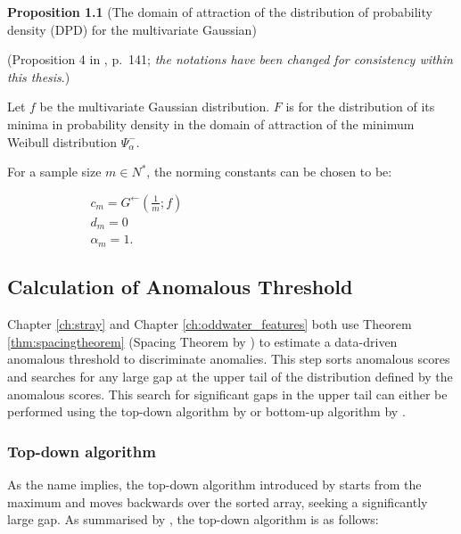 \documentclass{monashthesis}
\theoremstyle{definition}
\theoremstyle{definition}
\theoremstyle{definition}
\theoremstyle{remark}
\begin{document}
\textbf{Proposition 1.1} (The domain of attraction of the distribution of probability density (DPD) for the multivariate Gaussian)

(Proposition 4 in \textcite{hugueny2013novelty}, p.~141; \emph{the notations have been changed for consistency within this thesis}.)

Let \(f\) be the multivariate Gaussian distribution. \(F\) is for the distribution of its minima in probability density in the domain of attraction of the minimum Weibull distribution \(\Psi_{\alpha}^{-}\).

For a sample size \(m\in N^{*}\), the norming constants can be chosen to be:

\begin{flushleft}
        $\;\;\;\;\;\;\;\;\;\;\;\;\;\;\;\;\;\;\;\;\;\;\;\;c_{m} = G^{\longleftarrow} (\frac{1}{m};f)$\\
        $\;\;\;\;\;\;\;\;\;\;\;\;\;\;\;\;\;\;\;\;\;\;\;\;d_{m} = 0$\\
    $\;\;\;\;\;\;\;\;\;\;\;\;\;\;\;\;\;\;\;\;\;\;\;\;\alpha_{m}=1$.
\end{flushleft}

\hypertarget{calculation-of-anomalous-threshold}{%
\subsection{Calculation of Anomalous Threshold}\label{calculation-of-anomalous-threshold}}

Chapter \ref{ch:stray} and Chapter \ref{ch:oddwater_features} both use Theorem \ref{thm:spacingtheorem} (Spacing Theorem by \textcite{weissman1978estimation}) to estimate a data-driven anomalous threshold to discriminate anomalies. This step sorts anomalous scores and searches for any large gap at the upper tail of the distribution defined by the anomalous scores. This search for significant gaps in the upper tail can either be performed using the top-down algorithm by \textcite{burridge2006additive} or bottom-up algorithm by \textcite{schwarz2008wind}.

\hypertarget{top-down-algorithm}{%
\subsubsection{Top-down algorithm}\label{top-down-algorithm}}

As the name implies, the top-down algorithm introduced by \textcite{burridge2006additive} starts from the maximum and moves backwards over the sorted array, seeking a significantly large gap. As summarised by \textcite{schwarz2008wind}, the top-down algorithm is as follows:
\end{document}
